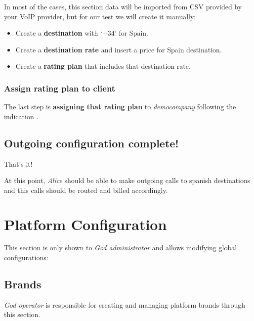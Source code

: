 \documentclass[letterpaper,10pt,english]{sphinxmanual}
\begin{document}
In most of the cases, this section data will be imported from CSV provided by your
VoIP provider, but for our test we will create it manually:
\begin{itemize}
\item {} 
Create a \textbf{destination} with `+34' for Spain.

\item {} 
Create a \textbf{destination rate} and insert a price for Spain destination.

\item {} 
Create a \textbf{rating plan} that includes that destination rate.

\end{itemize}


\subsection{Assign rating plan to client}
\label{getting_started/external_outgoing_calls/noplan_nocall:assign-rating-plan-to-client}
The last step is \textbf{assigning that rating plan} to \emph{democompany} following the indication
{\hyperref[administration_portal/brand/billing/rating_plans:assigning\string-rating\string-plans\string-to\string-clients]{}}.


\section{Outgoing configuration complete!}
\label{getting_started/external_outgoing_calls/finish:outgoing-configuration-complete}\label{getting_started/external_outgoing_calls/finish::doc}
That's it!

At this point, \emph{Alice} should be able to make outgoing calls to
spanish destinations and this calls should be routed and billed accordingly.


\chapter{Platform Configuration}
\label{administration_portal/platform/index::doc}\label{administration_portal/platform/index:platform-configuration}
This section is only shown to \emph{God administrator} and allows modifying global configurations:


\section{Brands}
\label{administration_portal/platform/brands:brands}\label{administration_portal/platform/brands::doc}\label{administration_portal/platform/brands:id1}
\emph{God operator} is responsible for creating and managing platform brands through this section.
\end{document}
